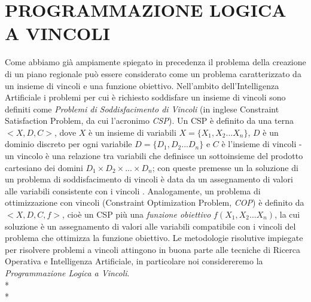 \documentclass[12pt,a4paper,openright,twoside]{report}
\begin{document}
\section[CLP]{\nohyphens{PROGRAMMAZIONE LOGICA A VINCOLI}}
Come abbiamo già ampiamente spiegato in precedenza il problema della creazione di un piano regionale può essere considerato come un problema caratterizzato da un insieme di vincoli e una funzione obiettivo. Nell'ambito dell'Intelligenza Artificiale i problemi per cui è richiesto soddisfare un insieme di vincoli sono definiti come \emph{Problemi di Soddisfacimento di Vincoli} (in inglese Constraint Satisfaction Problem, da cui l'acronimo \emph{CSP}). Un CSP è definito da una terna $<X,D,C>$, dove $X$ è un insieme di variabili $X=\{X_1,X_2...X_n\}$, $D$ è un dominio discreto per ogni variabile $D=\{D_1,D_2...D_n\}$ e $C$ è l'insieme di vincoli - un vincolo è una relazione tra variabili che definisce un sottoinsieme del prodotto cartesiano dei domini $D_1 \times D_2 \times ... \times D_n$; con queste premesse un la soluzione di un problema di soddisfacimento di vincoli è data da un assegnamento di valori alle variabili consistente con i vincoli \cite{cspFoundations}. Analogamente, un problema di ottimizzazione con vincoli (Constraint Optimization Problem, \emph{COP}) è definito da $<X,D,C,f>$, cioè un CSP più una \emph{funzione obiettivo} $f(X_1,X_2...X_n)$, la cui soluzione è un assegnamento di valori alle variabili compatibile con i vincoli del problema che ottimizza la funzione obiettivo. Le metodologie risolutive impiegate per risolvere problemi a vincoli attingono in buona parte alle tecniche di Ricerca Operativa e Intelligenza Artificiale, in particolare noi considereremo la \emph{Programmazione Logica a Vincoli}.\\*\\*
\end{document}
